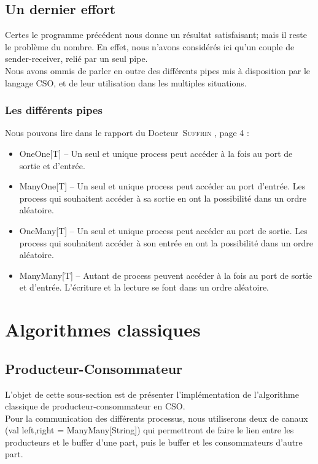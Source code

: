 \documentclass[a4paper,11pt,french]{report}
\begin{document}
\subsection{Un dernier effort}
Certes le programme précédent nous donne un résultat satisfaisant; mais il reste le problème du nombre. En effet, nous n'avons considérés ici qu'un couple de sender-receiver, relié par un seul pipe.\\
Nous avons ommis de parler en outre des différents pipes mis à disposition par le langage CSO, et de leur utilisation dans les multiples situations.

\subsubsection{Les différents pipes}
Nous pouvons lire dans le rapport du Docteur~\textsc{Suffrin} \cite{cpa2008-cso}, page 4 :
\begin{itemize}
\renewcommand{\labelitemi}{$\diamond$}
\item \textsf{OneOne[T]} -- Un seul et unique process peut accéder à la fois au port de sortie et d'entrée.
\item \textsf{ManyOne[T]} -- Un seul et unique process peut accéder au port d'entrée. Les process qui souhaitent accéder à sa sortie en ont la possibilité dans un ordre aléatoire.
\item \textsf{OneMany[T]} -- Un seul et unique process peut accéder au port de sortie. Les process qui souhaitent accéder à son entrée en ont la possibilité dans un ordre aléatoire.
\item \textsf{ManyMany[T]} -- Autant de process peuvent accéder à la fois au port de sortie et d'entrée. L'écriture et la lecture se font dans un ordre aléatoire.
\end{itemize}

\section{Algorithmes classiques}
\subsection{Producteur-Consommateur}

L'objet de cette sous-section est de présenter l'implémentation de l'algorithme classique de producteur-consommateur en CSO.\\
Pour la communication des différents processus, nous utiliserons deux de canaux (\textsf{val left,right = ManyMany[String]}) qui permettront de faire le lien entre les producteurs et le buffer d'une part, puis le buffer et les consommateurs d'autre part.
\end{document}
